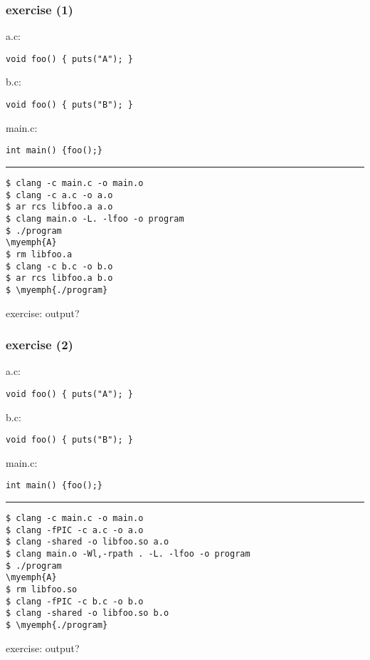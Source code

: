 \begin{frame}[fragile]\frametitle{exercise (1)}
\begin{minipage}{0.45\textwidth}
a.c:
\begin{Verbatim}[fontsize=\small]
void foo() { puts("A"); }
\end{Verbatim}
\end{minipage}
\begin{minipage}{0.45\textwidth}
b.c:
\begin{Verbatim}[fontsize=\small]
void foo() { puts("B"); }
\end{Verbatim}
\end{minipage}
main.c:
\begin{Verbatim}[fontsize=\small]
int main() {foo();}
\end{Verbatim}
\hrule
\begin{Verbatim}[fontsize=\small,commandchars=\\\{\}]
$ clang -c main.c -o main.o
$ clang -c a.c -o a.o
$ ar rcs libfoo.a a.o
$ clang main.o -L. -lfoo -o program
$ ./program
\myemph{A}
$ rm libfoo.a
$ clang -c b.c -o b.o
$ ar rcs libfoo.a b.o
$ \myemph{./program}
\end{Verbatim}
exercise: output?
\end{frame}

\begin{frame}[fragile]\frametitle{exercise (2)}
\begin{minipage}{0.45\textwidth}
a.c:
\begin{Verbatim}[fontsize=\small]
void foo() { puts("A"); }
\end{Verbatim}
\end{minipage}
\begin{minipage}{0.45\textwidth}
b.c:
\begin{Verbatim}[fontsize=\small]
void foo() { puts("B"); }
\end{Verbatim}
\end{minipage}
main.c:
\begin{Verbatim}[fontsize=\small]
int main() {foo();}
\end{Verbatim}
\hrule
\begin{Verbatim}[fontsize=\small,commandchars=\\\{\}]
$ clang -c main.c -o main.o
$ clang -fPIC -c a.c -o a.o
$ clang -shared -o libfoo.so a.o
$ clang main.o -Wl,-rpath . -L. -lfoo -o program
$ ./program
\myemph{A}
$ rm libfoo.so
$ clang -fPIC -c b.c -o b.o
$ clang -shared -o libfoo.so b.o
$ \myemph{./program}
\end{Verbatim}
exercise: output?
\end{frame}

